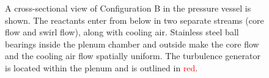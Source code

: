\begin{figure}
\begin{tikzpicture}[scale=0.9]
\end{tikzpicture}

\caption[Detail schematic of Configuration B]{A cross-sectional view of Configuration B in the pressure vessel is shown. The reactants enter from below in two separate streams (core flow and swirl flow), along with cooling air. Stainless steel ball bearings inside the plenum chamber and outside make the core flow and the cooling air flow spatially uniform. The turbulence generator is located within the plenum and is outlined in \textcolor{red}{red}.}

\label{fig:lsbB}

\end{figure}

